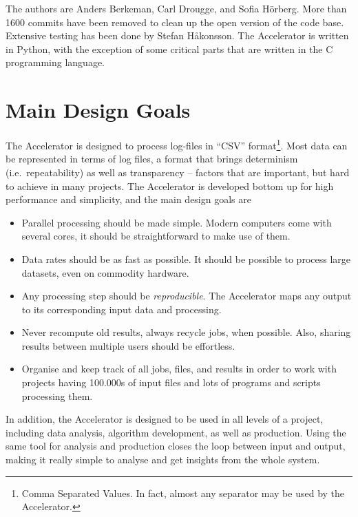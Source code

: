 The authors are Anders Berkeman, Carl Drougge, and Sofia H\"orberg.
More than 1600 commits have been removed to clean up the open version
of the code base.  Extensive testing has been done by Stefan
H{\aa}konsson.  The Accelerator is written in Python, with the
exception of some critical parts that are written in the C programming
language.



\section{Main Design Goals}
The Accelerator is designed to process log-files in ``CSV''
format\footnote{Comma Separated Values.  In fact, almost any separator
may be used by the Accelerator.}.  Most data can be represented in
terms of log files, a format that brings determinism (i.e.\
repeatability) as well as transparency -- factors that are important,
but hard to achieve in many projects.  The Accelerator is developed
bottom up for high performance and simplicity, and the main design
goals are
\begin{itemize}

\item[] Parallel processing should be made simple.  Modern computers
  come with several cores, it should be straightforward to make use of
  them.

\item[] Data rates should be as fast as possible.  It should be
  possible to process large datasets, even on commodity hardware.

\item[] Any processing step should be \textsl{reproducible}.
The Accelerator maps any output to its corresponding input data and
processing.

\item[] Never recompute old results, always recycle jobs, when
  possible.  Also, sharing results between multiple users should be
  effortless.

\item[] Organise and keep track of all jobs, files, and results in
  order to work with projects having 100.000s of input files and lots
  of programs and scripts processing them.
  
\end{itemize}
In addition, the Accelerator is designed to be used in all levels of a
project, including data analysis, algorithm development, as well as
production.  Using the same tool for analysis and production closes
the loop between input and output, making it really simple to analyse
and get insights from the whole system.



